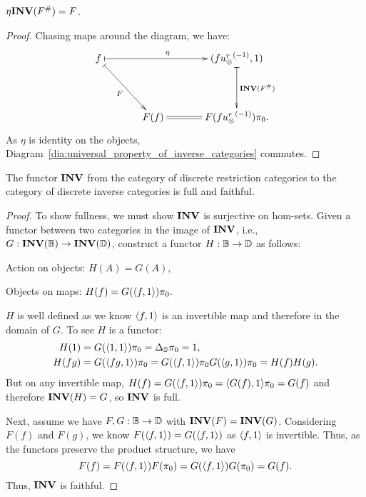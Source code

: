 \begin{lemma}\label{lem:universal_diagram_is_a_commutative_diagram}
  $\eta\mathbf{INV}({F^{\#}}) = F$.
\end{lemma}
\begin{proof}
  Chasing maps around the diagram, we have:
  \[
    \xymatrix @C=35pt @R=40pt{
      f \ar@{|->}[rr]^{\eta} \ar@{|->}[rd]_{F}&& (f\inv{\usr},1) \ar@{|->}[d]^{\Inv{F^{\#}}}\\
      &F(f) \ar@{=}[r] & F(f\inv{\usr})\pi_0.
    }
  \]
  As $\eta$ is identity on the objects, Diagram~\ref{dia:universal_property_of_inverse_categories}
  commutes.
\end{proof}

\begin{lemma}\label{lem:inv_is_full_and_faithful}
  The functor $\mathbf{INV}$ from the category of discrete restriction categories to the category of
  discrete inverse categories is full and faithful.
\end{lemma}
\begin{proof}
  To show fullness, we must show $\mathbf{INV}$ is surjective on hom-sets. Given a functor between two
  categories in the image of $\mathbf{INV}$, i.e., $G:\mathbf{INV}({\mathbb{B}})\to \mathbf{INV}({\mathbb{D}})$, construct a functor
  $H:\mathbb{B}\to\mathbb{D}$ as follows:
  \begin{description}
    \item{Action on objects:} $H(A) = G(A),$
    \item{Objects on maps:} $H(f) = G(\langle f,1\rangle)\pi_0.$
  \end{description}
  $H$ is well defined as we know $\langle f,1\rangle$ is an invertible map and therefore in the domain of $G$.
  To see $H$ is a functor:
  \begin{align*}
    H(1) &= G(\langle1,1\rangle)\pi_0 = \Delta_{\mathbb{D}}\pi_0 = 1,\\
    H(f g) &= G(\langle f g,1\rangle)\pi_0 = G(\langle f,1\rangle)\pi_0G(\langle g,1\rangle)\pi_0 = H(f)H(g).
  \end{align*}
  But on any invertible map, $H(f) = G(\langle f,1\rangle)\pi_0 = \langle G(f),1\rangle\pi_0 = G(f)$ and therefore
  $\mathbf{INV}({H}) = G$, so $\mathbf{INV}$ is full.

  Next, assume we have $F,G:\mathbb{B}\to\mathbb{D}$ with $\mathbf{INV}({F}) = \mathbf{INV}({G})$. Considering $F(f)$ and $F(g)$, we
  know $F(\langle f,1\rangle) = G(\langle f,1\rangle) $ as $\langle f,1\rangle$ is invertible. Thus, as the functors preserve the
  product structure, we have
  \[
    F(f) = F(\langle f,1\rangle)F(\pi_0)= G(\langle f,1\rangle)G(\pi_0)= G(f).
  \]
  Thus, $\mathbf{INV}$ is faithful.
\end{proof}

